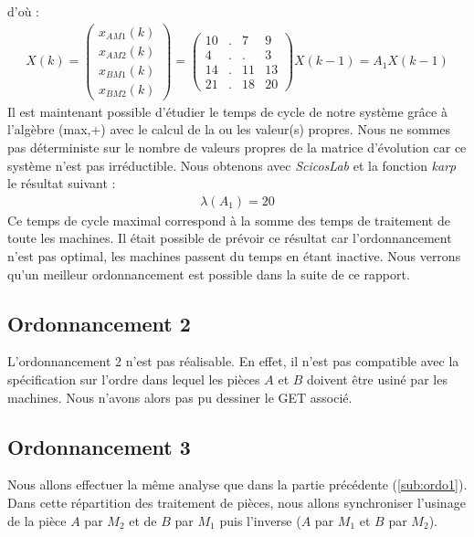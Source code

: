 d'où :
\begin{align}\label{equ:ordo1}
X(k) = \begin{pmatrix}
x_{AM1}(k) \\ x_{AM2}(k) \\ x_{BM1}(k)\\ x_{BM2}(k)
\end{pmatrix} 
= \begin{pmatrix}
10 & . & 7 &9\\
4 & . & . & 3\\
14 & . & 11 & 13\\
21 & . & 18 & 20
\end{pmatrix}X(k-1) = A_1X(k-1)
\end{align}
Il est maintenant possible d'étudier le temps de cycle de notre système grâce à l'algèbre (max,+) avec le calcul de la ou les valeur(s) propres. Nous ne sommes pas déterministe sur le nombre de valeurs propres de la matrice d'évolution car ce système n'est pas irréductible. Nous obtenons avec \emph{ScicosLab} et la fonction \emph{karp} le résultat suivant : \begin{eqnarray*}
\lambda(A_1) = 20
\end{eqnarray*}
Ce temps de cycle maximal correspond à la somme des temps de traitement de toute les machines. Il était possible de prévoir ce résultat car l'ordonnancement n'est pas optimal, les machines passent du temps en étant inactive. Nous verrons qu'un meilleur ordonnancement est possible dans la suite de ce rapport.

\subsection{Ordonnancement 2}
L'ordonnancement 2 n'est pas réalisable. En effet, il n'est pas compatible avec la spécification sur l'ordre dans lequel les pièces $A$ et $B$ doivent être usiné par les machines. Nous n'avons alors pas pu dessiner le GET associé.

\subsection{Ordonnancement 3}
Nous allons effectuer la même analyse que dans la partie précédente (\ref{sub:ordo1}). Dans cette répartition des traitement de pièces, nous allons synchroniser l'usinage de la pièce $A$ par $M_2$ et de $B$ par $M_1$ puis l'inverse ($A$ par $M_1$ et $B$ par $M_2$). 

